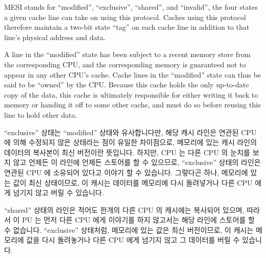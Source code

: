 MESI stands for ``modified'', ``exclusive'', ``shared'', and ``invalid'',
the four states a given cache line can take on using this
protocol.
Caches using this protocol therefore maintain a two-bit state ``tag'' on each
cache line in addition to that line's physical address and data.

A line in the ``modified'' state has been subject to a recent memory store
from the corresponding CPU, and the corresponding memory is guaranteed
not to appear in any other CPU's cache.
Cache lines in the ``modified'' state can thus be said to be ``owned''
by the CPU.
Because this cache holds the only up-to-date copy of the data, this
cache is ultimately responsible for either writing it back to memory
or handing it off to some other cache, and must do so before reusing
this line to hold other data.
\fi

``exclusive'' 상태는 ``modified'' 상태와 유사합니다만, 해당 캐시 라인은 연관된
CPU 에 의해 수정되지 않은 상태라는 점이 유일한 차이점으로, 메모리에 있는 캐시
라인의 데이터의 복사본이 최신 버전이란 뜻입니다.
하지만, CPU 는 다른 CPU 의 눈치를 보지 않고 언제든 이 라인에 언제든 스토어를 할
수 있으므로, ``exclusive'' 상태의 라인은 연관된 CPU 에 소유되어 있다고 이야기
할 수 있습니다.
그렇다곤 하나, 메모리에 있는 값이 최신 상태이므로, 이 캐시는 데이터를 메모리에
다시 돌려넣거나 다른 CPU 에게 넘기지 않고 버릴 수 있습니다.

``shared'' 상태의 라인은 적어도 한개의 다른 CPU 의 캐시에는 복사되어 있으며,
따라서 이 PU 는 먼저 다른 CPU 에게 이야기를 하지 않고서는 해당 라인에 스토어를
할 수 없습니다.
``exclusive'' 상태처럼, 메모리에 있는 값은 최신 버전이므로, 이 캐시는 메모리에
값을 다시 돌려놓거나 다른 CPU 에게 넘기지 않고 그 데이터를 버릴 수 있습니다.

